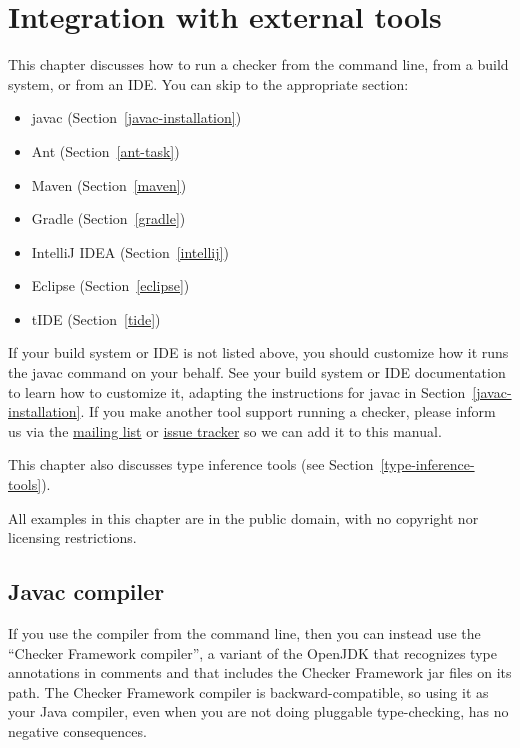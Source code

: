 \htmlhr
\chapter{Integration with external tools\label{external-tools}}

This chapter discusses how to run a checker from the command line, from a
build system, or from an IDE\@.  You can skip to the appropriate section:

\begin{itemize}
\item javac (Section~\ref{javac-installation})
\item Ant (Section~\ref{ant-task})
\item Maven (Section~\ref{maven})
\item Gradle (Section~\ref{gradle})
\item IntelliJ IDEA (Section~\ref{intellij})
\item Eclipse (Section~\ref{eclipse})
\item tIDE (Section~\ref{tide})
\end{itemize}

If your build system or IDE is not listed above, you should customize how
it runs the javac command on your behalf.  See your build system or IDE
documentation to learn how to
customize it, adapting the instructions for javac in Section~\ref{javac-installation}.
If you make another tool support running a checker, please
inform us via the
\href{http://groups.google.com/group/checker-framework-discuss}{mailing
  list} or
\href{http://code.google.com/p/checker-framework/issues/list}{issue tracker} so
we can add it to this manual.

This chapter also discusses type inference tools (see
Section~\ref{type-inference-tools}).

All examples in this chapter are in the public domain, with no copyright nor
licensing restrictions.


\section{Javac compiler\label{javac-installation}}

If you use the  compiler from the command line, then you can
instead use the ``Checker Framework compiler'', a variant of the OpenJDK
 that recognizes type annotations in comments and that includes
the Checker Framework jar files on its path.
The Checker Framework compiler is backward-compatible, so using it as your
Java compiler, even when you are not doing pluggable type-checking, has no
negative consequences.


